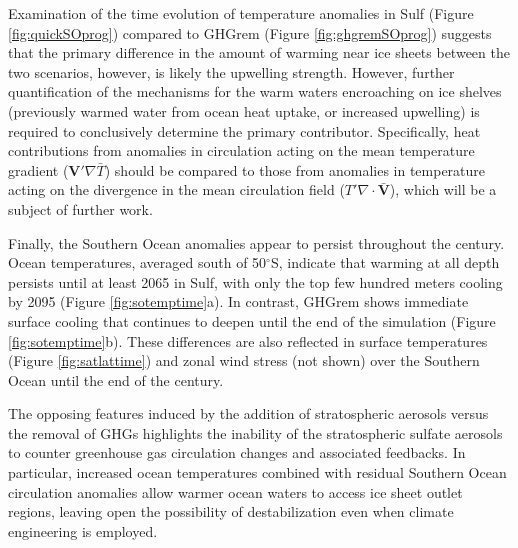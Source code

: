 \documentclass[grl]{AGUTeX}  %
\begin{document}
\begin{article}
Examination of the time evolution of temperature anomalies in Sulf (Figure \ref{fig:quickSOprog}) compared to GHGrem (Figure \ref{fig:ghgremSOprog}) suggests that the primary difference in the amount of warming near ice sheets between the two scenarios, however, is likely the upwelling strength. However, further quantification of the mechanisms for the warm waters encroaching on ice shelves (previously warmed water from ocean heat uptake, or increased upwelling) is required to conclusively determine the primary contributor. Specifically, heat contributions from anomalies in circulation acting on the mean temperature gradient ($\textbf{V}' \nabla \bar{T}$) should be compared to those from anomalies in temperature acting on the divergence in the mean circulation field ($T'\nabla\cdot \bar{\textbf{V}}$), which will be a subject of further work. %



Finally, the Southern Ocean anomalies appear to persist throughout the century. Ocean temperatures, averaged south of 50$^\circ$S, indicate that warming at all depth persists until at least 2065 in Sulf, with only the top few hundred meters cooling by 2095 (Figure \ref{fig:sotemptime}a). In contrast, GHGrem shows immediate surface cooling that continues to deepen until the end of the simulation (Figure \ref{fig:sotemptime}b). These differences are also reflected in surface temperatures (Figure \ref{fig:satlattime}) and zonal wind stress (not shown) over the Southern Ocean until the end of the century.

The opposing features induced by the addition of stratospheric aerosols versus the removal of GHGs highlights the inability of the stratospheric sulfate aerosols to counter greenhouse gas circulation changes and associated feedbacks. In particular, increased ocean temperatures combined with residual Southern Ocean circulation anomalies allow warmer ocean waters to access ice sheet outlet regions, leaving open the possibility of destabilization even when climate engineering is employed.




\end{article}
\end{document}
